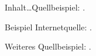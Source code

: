 
\setcounter{page}{1}

Inhalt\ldots Quellbeispiel: \cite[S.~2]{Plenk2019}.

Beispiel Internetquelle: \cite{Siemens2023}.

Weiteres Quellbeispiel: \cite[S.~30ff.]{Siemens}.
